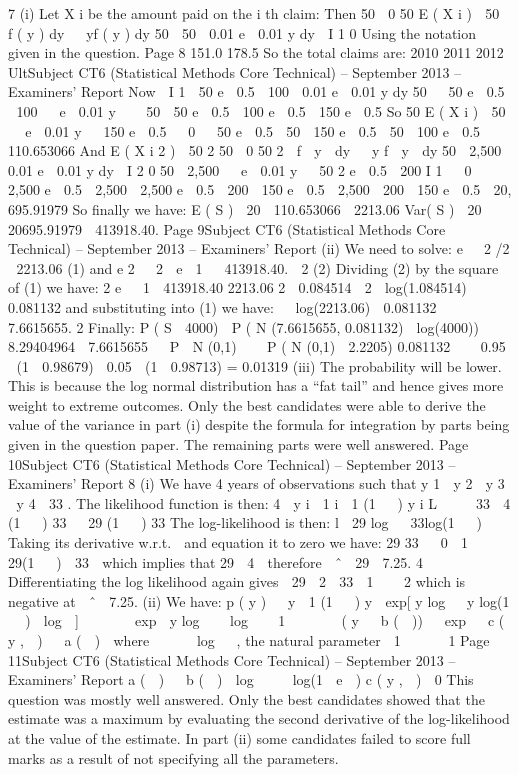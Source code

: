 7
(i)
Let X i be the amount paid on the i th claim:
Then
50 
0 50
E ( X i )  50  f ( y ) dy   yf ( y ) dy
50
 50  0.01 e  0.01 y dy  I 1
0
Using the notation given in the question.
Page 8
151.0
178.5
So the total claims are:
2010
2011
2012
UltSubject CT6 (Statistical Methods Core Technical) – September 2013 – Examiners’ Report
Now

I 1  50 e  0.5  100  0.01 e  0.01 y dy
50

 50 e  0.5  100   e  0.01 y 

 50
 50 e  0.5  100 e  0.5  150 e  0.5
So
50
E ( X i )  50   e  0.01 y   150 e  0.5

 0
  50 e  0.5  50  150 e  0.5  50  100 e  0.5  110.653066
And
E ( X i 2 )
 50
2
50 
0 50
2
 f  y  dy   y f  y  dy
50
 2,500  0.01 e  0.01 y dy  I 2
0
50
 2,500   e  0.01 y   50 2 e  0.5  200 I 1

 0
  2,500 e  0.5  2,500  2,500 e  0.5  200  150 e  0.5
 2,500  200  150 e  0.5  20, 695.91979
So finally we have:
E ( S )  20  110.653066  2213.06
Var( S )  20  20695.91979  413918.40.
Page 9Subject CT6 (Statistical Methods Core Technical) – September 2013 – Examiners’ Report
(ii)
We need to solve:
e 
2
/2
 2213.06 (1)
and
e 2 
2
 e  1   413918.40.
 2
(2)
Dividing (2) by the square of (1) we have:
2
e   1 
413918.40
2213.06 2
 0.084514
 2  log(1.084514)  0.081132
and substituting into (1) we have:
  log(2213.06) 
0.081132
 7.6615655.
2
Finally:
P ( S  4000)  P ( N (7.6615655, 0.081132)  log(4000))

8.29404964  7.6615655 
 P  N (0,1) 
  P ( N (0,1)  2.2205)
0.081132


 0.95  (1  0.98679)  0.05  (1  0.98713)
= 0.01319
(iii)
The probability will be lower.
This is because the log normal distribution has a “fat tail” and hence gives
more weight to extreme outcomes.
Only the best candidates were able to derive the value of the variance in part (i) despite the
formula for integration by parts being given in the question paper. The remaining parts were
well answered.
Page 10Subject CT6 (Statistical Methods Core Technical) – September 2013 – Examiners’ Report
8
(i)
We have 4 years of observations such that y 1  y 2  y 3  y 4  33 . The
likelihood function is then:
4  y i  1
i  1 (1   ) y i
L  

 33  4
(1   ) 33

 29
(1   ) 33
The log-likelihood is then:
l  29 log   33log(1   )
Taking its derivative w.r.t.  and equation it to zero we have:
29
33

 0
 1  
29(1   )  33 
which implies that 29  4 
therefore  ˆ 
29
 7.25.
4
Differentiating the log likelihood again gives 
29

2

33
 1    2
which is
negative at  ˆ  7.25.
(ii)
We have:
p ( y ) 
 y  1
(1   ) y
 exp[ y log   y log(1   )  log  ]


  
 exp  y log 
  log  
 1   


 ( y   b (  ))

 exp 
 c ( y ,  ) 
 a (  )

where
  
  log 
 , the natural parameter
 1   
  1
Page 11Subject CT6 (Statistical Methods Core Technical) – September 2013 – Examiners’ Report
a (  )  
b (  )  log     log(1  e  )
c ( y ,  )  0
This question was mostly well answered. Only the best candidates showed that the estimate
was a maximum by evaluating the second derivative of the log-likelihood at the value of the
estimate. In part (ii) some candidates failed to score full marks as a result of not specifying
all the parameters.
